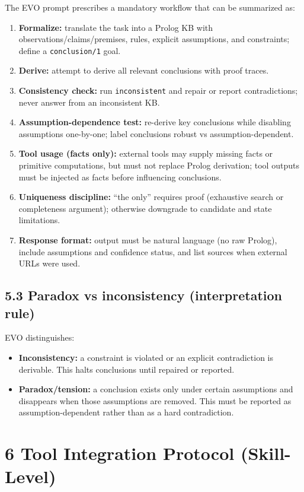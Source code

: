 \documentclass[12pt,a4paper]{article}
\begin{document}
The EVO prompt prescribes a mandatory workflow that can be summarized as:
\begin{enumerate}[leftmargin=*,topsep=2pt,itemsep=2pt]
\item \textbf{Formalize:} translate the task into a Prolog KB with observations/claims/premises, rules, explicit assumptions, and constraints; define a \texttt{conclusion/1} goal.
\item \textbf{Derive:} attempt to derive all relevant conclusions with proof traces.
\item \textbf{Consistency check:} run \texttt{inconsistent} and repair or report contradictions; never answer from an inconsistent KB.
\item \textbf{Assumption-dependence test:} re-derive key conclusions while disabling assumptions one-by-one; label conclusions robust vs assumption-dependent.
\item \textbf{Tool usage (facts only):} external tools may supply missing facts or primitive computations, but must not replace Prolog derivation; tool outputs must be injected as facts before influencing conclusions.
\item \textbf{Uniqueness discipline:} ``the only'' requires proof (exhaustive search or completeness argument); otherwise downgrade to candidate and state limitations.
\item \textbf{Response format:} output must be natural language (no raw Prolog), include assumptions and confidence status, and list sources when external URLs were used.
\end{enumerate}

\subsection{5.3 Paradox vs inconsistency (interpretation rule)}

EVO distinguishes:
\begin{itemize}[leftmargin=*,topsep=2pt,itemsep=2pt]
\item \textbf{Inconsistency:} a constraint is violated or an explicit contradiction is derivable. This halts conclusions until repaired or reported.
\item \textbf{Paradox/tension:} a conclusion exists only under certain assumptions and disappears when those assumptions are removed. This must be reported as assumption-dependent rather than as a hard contradiction.
\end{itemize}

\section{6 Tool Integration Protocol (Skill-Level)}
\end{document}
